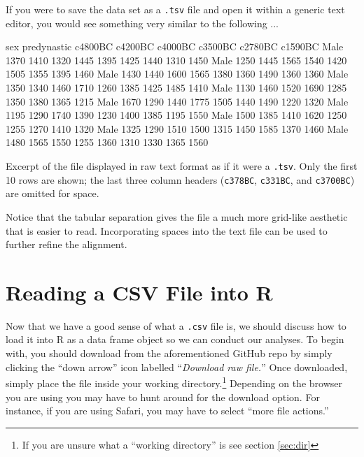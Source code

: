 If you were to save the  data set as a \texttt{.tsv} file and open it within a generic text editor, you would see something very similar to the following ...

\vspace{1em}

\begin{listing}[H]
\begin{raw}
sex	predynastic	c4800BC	c4200BC	c4000BC	c3500BC	c2780BC	c1590BC
Male	1370	1410	1320	1445	1395	1425	1440	1310	1450	
Male	1250	1445	1565	1540	1420	1505	1355	1395	1460	
Male	1430	1440	1600	1565	1380	1360	1490	1360	1360	
Male	1350	1340	1460	1710	1260	1385	1425	1485	1410	
Male	1130	1460	1520	1690	1285	1350	1380	1365	1215	
Male	1670	1290	1440	1775	1505	1440	1490	1220	1320	
Male	1195	1290	1740	1390	1230	1400	1385	1195	1550	
Male	1500	1385	1410	1620	1250	1255	1270	1410	1320	
Male	1325	1290	1510	1500	1315	1450	1585	1370	1460	
Male	1480	1565	1550	1255	1360	1310	1330	1365	1560	
\end{raw}
\caption*{Excerpt of the  file displayed in raw text format as if it were a \texttt{.tsv}. Only the first 10 rows are shown; the last three column headers (\texttt{c378BC}, \texttt{c331BC}, and \texttt{c3700BC}) are omitted for space.}
\end{listing}

\noindent Notice that the tabular separation gives the file a much more grid-like aesthetic that is easier to read. Incorporating spaces into the text file can be used to further refine the alignment.

\section{Reading a CSV File into R}

Now that we have a good sense of what a \texttt{.csv} file is, we should discuss how to load it into R as a data frame object so we can conduct our analyses. To begin with, you should download  from the aforementioned GitHub repo by simply clicking the ``down arrow'' icon labelled ``\textit{Download raw file.}'' Once downloaded, simply place the file inside your working directory.\footnote{If you are unsure what a ``working directory'' is see section \ref{sec:dir}} Depending on the browser you are using you may have to hunt around for the download option. For instance, if you are using Safari, you may have to select ``more file actions.''

